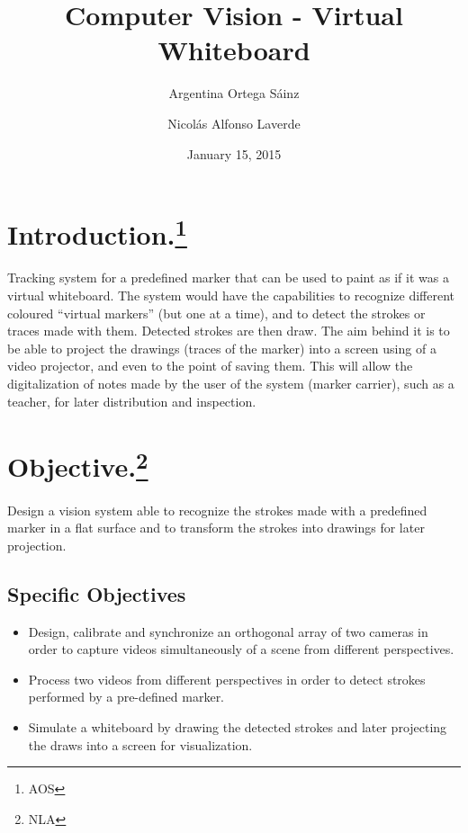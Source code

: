 \documentclass[a4paper,12pt]{article}
\title{Computer Vision - Virtual Whiteboard}
\author{Argentina Ortega Sáinz \and
        Nicolás Alfonso Laverde}
\date{January 15, 2015}
\begin{document}
\maketitle
{}







\section[Introduction]{Introduction.\footnote{AOS}}
Tracking system for a predefined marker that can be used to paint as if it was a virtual whiteboard. The system would have the capabilities to recognize different coloured “virtual markers” (but one at a time), and to detect the strokes or traces made with them. Detected strokes are then draw.
The aim behind it is to be able to project the drawings (traces of the marker) into a screen using of a video projector, and even to the point of saving them. This will allow the digitalization of notes made by the user of the system (marker carrier), such as a teacher, for later distribution and inspection.
\section[Objective]{Objective.\footnote{NLA}}
Design a vision system able to recognize the strokes made with a predefined marker in a flat surface and to transform the strokes into drawings for later projection.
\subsection{Specific Objectives}
\begin{itemize}
\item Design, calibrate and synchronize an orthogonal array of two cameras in order to capture videos simultaneously of a scene from different perspectives.
\item Process two videos from different perspectives in order to detect strokes performed by a pre-defined marker.
\item Simulate a whiteboard by drawing the detected strokes and later projecting the draws into a screen for visualization.
\end{itemize}
\end{document}
